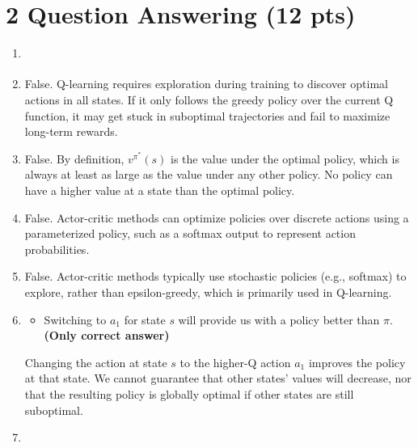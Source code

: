 \documentclass[12pt]{article}
\begin{document}
\section*{2 Question Answering (12 pts)}
\begin{enumerate}
    \item \noindent\begin{solution}[height=5cm] 
    \end{solution}

    \item \noindent\begin{solution}[height=5cm]
        False. Q-learning requires exploration during training to discover optimal actions in all states. If it only follows the greedy policy over the current Q function, it may get stuck in suboptimal trajectories and fail to maximize long-term rewards.
    \end{solution}

    \item \noindent\begin{solution}[height=5cm]
    False. By definition, $v^{\pi^*}(s)$ is the value under the optimal policy, which is always at least as large as the value under any other policy. No policy can have a higher value at a state than the optimal policy.
    \end{solution}

    \item \noindent\begin{solution}[height=5cm]
    False. Actor-critic methods can optimize policies over discrete actions using a parameterized policy, such as a softmax output to represent action probabilities.
    \end{solution}

    \item \noindent\begin{solution}[height=5cm]
    False. Actor-critic methods typically use stochastic policies (e.g., softmax) to explore, rather than epsilon-greedy, which is primarily used in Q-learning.
    \end{solution}

    \item \noindent\begin{solution}[height=5cm]
    \begin{itemize}
        \item Switching to $a_1$ for state $s$ will provide us with a policy better than $\pi$. \textbf{(Only correct answer)}
    \end{itemize}
    Changing the action at state $s$ to the higher-Q action $a_1$ improves the policy at that state. We cannot guarantee that other states’ values will decrease, nor that the resulting policy is globally optimal if other states are still suboptimal.
    \end{solution}

    \item \noindent\begin{solution}[height=5cm]
    \end{solution}
\end{enumerate}
\end{document}
